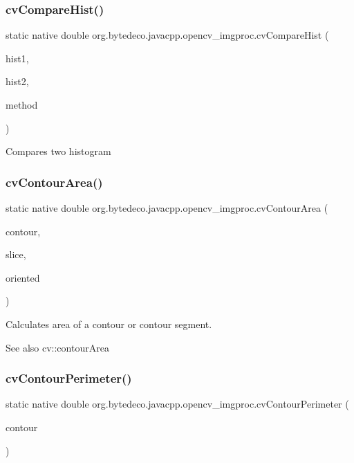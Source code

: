 \subsubsection{\texorpdfstring{cv\+Compare\+Hist()}{cvCompareHist()}}
{\footnotesize\ttfamily static native double org.\+bytedeco.\+javacpp.\+opencv\+\_\+imgproc.\+cv\+Compare\+Hist (\begin{DoxyParamCaption}\item[{@Const Cv\+Histogram}]{hist1,  }\item[{@Const Cv\+Histogram}]{hist2,  }\item[{int}]{method }\end{DoxyParamCaption})\hspace{0.3cm}{\ttfamily [static]}}

Compares two histogram \mbox{\label{group__imgproc__c_gad23835119946d5ed21a357412881bb58}} 
\subsubsection{\texorpdfstring{cv\+Contour\+Area()}{cvContourArea()}}
{\footnotesize\ttfamily static native double org.\+bytedeco.\+javacpp.\+opencv\+\_\+imgproc.\+cv\+Contour\+Area (\begin{DoxyParamCaption}\item[{@Const Cv\+Arr}]{contour,  }\item[{@By\+Val(null\+Value=\char`\"{}Cv\+Slice(C\+V\+\_\+\+W\+H\+O\+L\+E\+\_\+\+S\+EQ)\char`\"{}) Cv\+Slice}]{slice,  }\item[{int}]{oriented }\end{DoxyParamCaption})\hspace{0.3cm}{\ttfamily [static]}}



Calculates area of a contour or contour segment. 

\begin{DoxySeeAlso}{See also}
cv\+::contour\+Area 
\end{DoxySeeAlso}
\mbox{\label{group__imgproc__c_ga420bd05e2f839e52bdb1db41cea427af}} 
\subsubsection{\texorpdfstring{cv\+Contour\+Perimeter()}{cvContourPerimeter()}}
{\footnotesize\ttfamily static native double org.\+bytedeco.\+javacpp.\+opencv\+\_\+imgproc.\+cv\+Contour\+Perimeter (\begin{DoxyParamCaption}\item[{@Const Pointer}]{contour }\end{DoxyParamCaption})\hspace{0.3cm}{\ttfamily [static]}}

